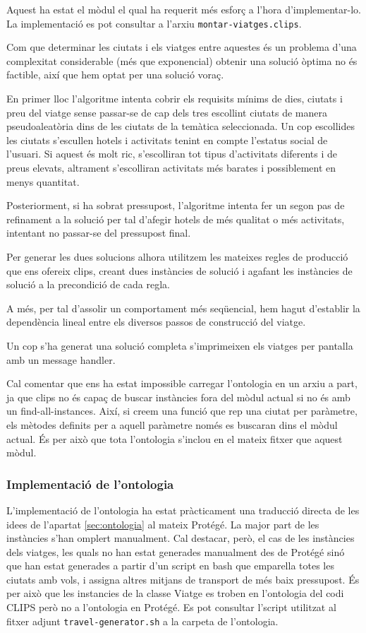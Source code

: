 \documentclass[11pt,a4paper]{article}
\begin{document}
Aquest ha estat el mòdul el qual ha requerit més esforç a l'hora d'implementar-lo. La implementació es pot consultar a l'arxiu \texttt{montar-viatges.clips}.

Com que determinar les ciutats i els viatges entre aquestes és un problema d'una complexitat considerable (més que exponencial) obtenir una solució òptima no és factible, així que hem optat per una solució voraç.

En primer lloc l'algoritme intenta cobrir els requisits mínims de dies, ciutats i preu del viatge sense passar-se de cap dels tres escollint ciutats de manera pseudoaleatòria dins de les ciutats de la temàtica seleccionada. Un cop escollides les ciutats s'escullen hotels i activitats tenint en compte l'estatus social de l'usuari. Si aquest és molt ric, s'escolliran tot tipus d'activitats diferents i de preus elevats, altrament s'escolliran activitats més barates i possiblement en menys quantitat.

Posteriorment, si ha sobrat pressupost, l'algoritme intenta fer un segon pas de refinament a la solució per tal d'afegir hotels de més qualitat o més activitats, intentant no passar-se del pressupost final.

Per generar les dues solucions alhora utilitzem les mateixes regles de producció que ens ofereix clips, creant dues instàncies de solució i agafant les instàncies de solució a la precondició de cada regla.

A més, per tal d'assolir un comportament més seqüencial, hem hagut d'establir la dependència lineal entre els diversos passos de construcció del viatge.

Un cop s'ha generat una solució completa s'imprimeixen els viatges per pantalla amb un message handler.

Cal comentar que ens ha estat impossible carregar l'ontologia en un arxiu a part, ja que clips no és capaç de buscar instàncies fora del mòdul actual si no és amb un find-all-instances. Així, si creem una funció que rep una ciutat per paràmetre, els mètodes definits per a aquell paràmetre només es buscaran dins el mòdul actual. És per això que tota l'ontologia s'inclou en el mateix fitxer que aquest mòdul.


\subsubsection{Implementació de l'ontologia}
L'implementació de l'ontologia ha estat pràcticament una traducció directa de les idees de l'apartat \ref{sec:ontologia} al mateix Protégé. La major part de les instàncies s'han omplert manualment. Cal destacar, però, el cas de les instàncies dels viatges, les quals no han estat generades manualment des de Protégé sinó que han estat generades a partir d'un script en bash que emparella totes les ciutats amb vols, i assigna altres mitjans de transport de més baix pressupost. És per això que les instancies de la classe Viatge es troben en l'ontologia del codi CLIPS però no a l'ontologia en Protégé. Es pot consultar l'script utilitzat al fitxer adjunt \texttt{travel-generator.sh} a la carpeta de l'ontologia.
\end{document}
